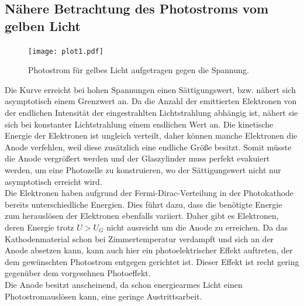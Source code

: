 
\subsection{Nähere Betrachtung des Photostroms vom gelben Licht} %
\label{sub:Nähere Betrachtung des Photostroms vom gelben Licht}

\begin{figure}[H]
  \centering
  \texttt{[image: plot1.pdf]}
  \caption{Photostrom für gelbes Licht aufgetragen gegen die Spannung.}
  \label{fig:plot1}
\end{figure}

Die Kurve erreicht bei hohen Spannungen einen Sättigungswert, bzw. nähert sich asymptotisch einem Grenzwert an.
Da die Anzahl der emittierten Elektronen von der endlichen Intensität der eingestrahlten Lichtstrahlung abhängig ist,
nähert sie sich bei konstanter Lichtstrahlung einem endlichen Wert an.
Die kinetische Energie der Elektronen ist ungleich verteilt, daher können manche Elektronen die Anode verfehlen,
weil diese zusätzlich eine endliche Größe besitzt. Somit müsste die Anode vergrößert werden und der Glaszylinder muss perfekt
evakuiert werden, um eine Photozelle zu konstruieren, wo der Sättigungswert nicht nur asymptotisch erreicht wird.\\
Die Elektronen haben aufgrund der Fermi-Dirac-Verteilung in der Photokathode bereits unterschiedliche Energien.
Dies führt dazu, dass die benötigte Energie zum herauslösen der Elektronen ebenfalls variiert.
Daher gibt es Elektronen, deren Energie trotz $U > U_G$ nicht ausreicht um die Anode zu erreichen.
Da das Kathodenmaterial schon bei Zimmertemperatur verdampft\cite{V500} und sich an der Anode absetzen kann,
kann auch hier ein photoelektrischer Effekt auftreten, der dem gewünschten Photostrom entgegen gerichtet ist.
Dieser Effekt ist recht gering gegenüber dem vorgesehnen Photoeffekt.\\
Die Anode besitzt anscheinend, da schon energiearmes Licht einen Photostromauslösen kann, eine geringe Austrittsarbeit.

